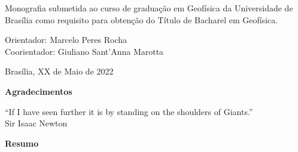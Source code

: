 \documentclass[a4paper, 12 pt]{article} %
\begin{document}
\begin{flushright}

\begin{list}{}{
      \setlength{\leftmargin}{8.5cm}
      \setlength{\rightmargin}{0cm}
      \setlength{\labelwidth}{0pt}
      \setlength{\labelsep}{\leftmargin}}

      \item Monografia submetida ao curso de graduação em Geofísica da Universidade de Brasília como requisito para obtenção do Título de Bacharel em Geofísica.
\end{list}
      
\end{flushright}

\begin{center}
	\vspace{15mm}

	Orientador: Marcelo Peres Rocha \\
	Coorientador: Giuliano Sant’Anna Marotta
	
	\vfill
	
	Brasília, XX de Maio de 2022
\end{center}

\clearpage


\begin{center}
    \large{\textbf{Agradecimentos}}
\end{center}

\blindtext

\blindtext

\blindtext


\clearpage

\clearpage
\hspace{1mm}

\vfill


\begin{flushright}
	\begin{itshape}
		``If I have seen further it is by standing on the shoulders of Giants.''\\ Sir Isaac Newton
	\end{itshape}
\end{flushright}

\clearpage


\begin{center}
    \large{\textbf{Resumo}}
\end{center}
\end{document}
